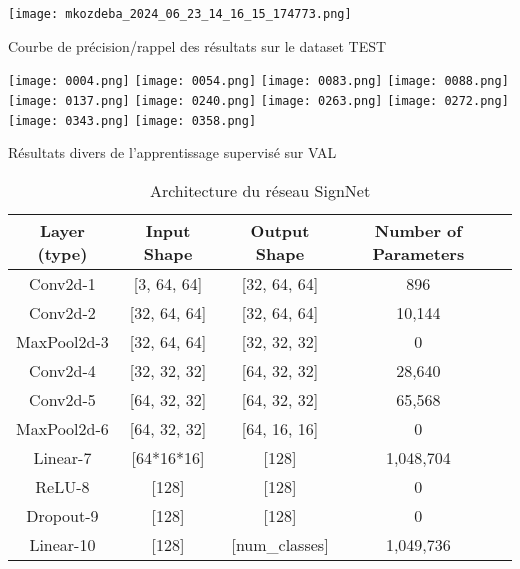 \documentclass[a4paper,11pt]{article}
\begin{document}
\begin{table}[H]
    \centering
    \texttt{[image: mkozdeba\_2024\_06\_23\_14\_16\_15\_174773.png]}
    \caption{Courbe de précision/rappel des résultats sur le dataset TEST}
    \label{fig:enter-label}
\end{table}

\begin{table}[H]
    \centering
    \texttt{[image: 0004.png]}
    \texttt{[image: 0054.png]}
    \texttt{[image: 0083.png]}
    \texttt{[image: 0088.png]}
    \texttt{[image: 0137.png]}
    \texttt{[image: 0240.png]}
    \texttt{[image: 0263.png]}
    \texttt{[image: 0272.png]}
    \texttt{[image: 0343.png]}
    \texttt{[image: 0358.png]}
    \caption{Résultats divers de l'apprentissage supervisé sur VAL}
    \label{fig:enter-label}
\end{table}

\begin{table}
 \begin{tabular}{|c|c|c|c|c|}
    \hline
    \textbf{Layer (type)} & \textbf{Input Shape} & \textbf{Output Shape} & \textbf{Number of Parameters} \\
    \hline
    Conv2d-1 & [3, 64, 64] & [32, 64, 64] & 896 \\
    \hline
    Conv2d-2 & [32, 64, 64] & [32, 64, 64] & 10,144 \\
    \hline
    MaxPool2d-3 & [32, 64, 64] & [32, 32, 32] & 0 \\
    \hline
    Conv2d-4 & [32, 32, 32] & [64, 32, 32] & 28,640 \\
    \hline
    Conv2d-5 & [64, 32, 32] & [64, 32, 32] & 65,568 \\
    \hline
    MaxPool2d-6 & [64, 32, 32] & [64, 16, 16] & 0 \\
    \hline
    Linear-7 & [64*16*16] & [128] & 1,048,704 \\
    \hline
    ReLU-8 & [128] & [128]& 0 \\
    \hline
    Dropout-9 & [128] & [128] & 0 \\
    \hline
    Linear-10 & [128] & [num\_classes] & 1,049,736 \\
    \hline
    \end{tabular}
    \caption{Architecture du réseau SignNet}
\end{table}
\end{document}
